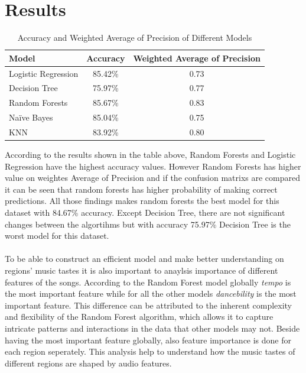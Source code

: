 

\chapter{Results}

\begin{table}[htbp]
    \centering
    \begin{tabular}{|l|c|c|}
    \hline
    \textbf{Model}           & \textbf{Accuracy} & \textbf{Weighted Average of Precision} \\ \hline
    Logistic Regression & 85.42\%          & 0.73                \\ \hline
    Decision Tree       & 75.97\%          & 0.77              \\ \hline
    Random Forests      & 85.67\%          & 0.83             \\ \hline
    Naïve Bayes         & 85.04\%          & 0.75               \\ \hline
    KNN                 & 83.92\%          & 0.80               \\ \hline
    \end{tabular}
    \caption{Accuracy and Weighted Average of Precision of Different Models}
    \end{table}
    
According to the results shown in the table above, Random Forests and Logistic Regression have the highest accuracy values. However Random Forests has 
higher value on weightes Average of Precision and if the confusion matrixs are compared it can be seen that random forests has higher 
probability of making correct predictions. All those findings makes random forests the best model for this dataset with 84.67\% accuracy. Except Decision Tree, there are not 
significant changes between the algortihms but with accuracy 75.97\% Decision Tree is the worst model for this dataset.
\\
\\
To be able to construct an efficient model and make better understanding on regions' music tastes it is also important to anaylsis importance of
different features of the songs. According to the Random Forest model globally \textit{tempo} is the most important feature while for all the other models 
\textit{dancebility} is the most important feature. This difference can be attributed to the inherent complexity and flexibility of the Random Forest
algorithm, which allows it to capture intricate patterns and interactions in the data that other models may not. Beside having the most important feature globally,
also feature importance is done for each region seperately. This analysis help to understand how the music tastes of different regions are shaped by audio features. 


